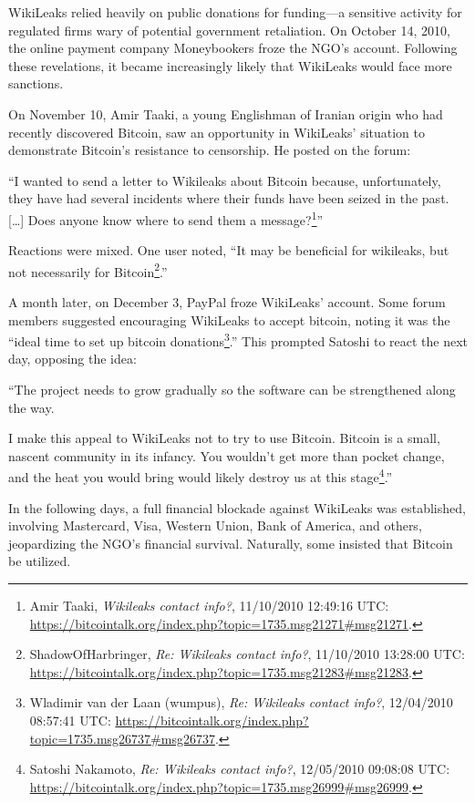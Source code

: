 \documentclass[
  a5paper,
  smalldemyvopaper,10pt,twoside,onecolumn,openright,extrafontsizes,hidelinks]{memoir}
\begin{document}
WikiLeaks relied heavily on public donations for funding---a sensitive
activity for regulated firms wary of potential government retaliation.
On October 14, 2010, the online payment company Moneybookers froze the
NGO's account. Following these revelations, it became increasingly
likely that WikiLeaks would face more sanctions.

On November 10, Amir Taaki, a young Englishman of Iranian origin who had
recently discovered Bitcoin, saw an opportunity in WikiLeaks' situation
to demonstrate Bitcoin's resistance to censorship. He posted on the
forum:

``I wanted to send a letter to Wikileaks about Bitcoin because,
unfortunately, they have had several incidents where their funds have
been seized in the past. {[}\ldots{]} Does anyone know where to send
them a message?\footnote{Amir Taaki, \emph{Wikileaks contact info?},
  11/10/2010 12:49:16 UTC:
  \url{https://bitcointalk.org/index.php?topic=1735.msg21271\#msg21271}.}''

Reactions were mixed. One user noted, ``It may be beneficial for
wikileaks, but not necessarily for Bitcoin\footnote{ShadowOfHarbringer,
  \emph{Re: Wikileaks contact info?}, 11/10/2010 13:28:00 UTC:
  \url{https://bitcointalk.org/index.php?topic=1735.msg21283\#msg21283}.}.''

A month later, on December 3, PayPal froze WikiLeaks' account. Some
forum members suggested encouraging WikiLeaks to accept bitcoin, noting
it was the ``ideal time to set up bitcoin donations\footnote{Wladimir
  van der Laan (wumpus), \emph{Re: Wikileaks contact info?}, 12/04/2010
  08:57:41 UTC:
  \url{https://bitcointalk.org/index.php?topic=1735.msg26737\#msg26737}.}.''
This prompted Satoshi to react the next day, opposing the idea:

``The project needs to grow gradually so the software can be
strengthened along the way.

I make this appeal to WikiLeaks not to try to use Bitcoin. Bitcoin is a
small, nascent community in its infancy. You wouldn't get more than
pocket change, and the heat you would bring would likely destroy us at
this stage\footnote{Satoshi Nakamoto, \emph{Re: Wikileaks contact
  info?}, 12/05/2010 09:08:08 UTC:
  \url{https://bitcointalk.org/index.php?topic=1735.msg26999\#msg26999}.}.''

In the following days, a full financial blockade against WikiLeaks was
established, involving Mastercard, Visa, Western Union, Bank of America,
and others, jeopardizing the NGO's financial survival. Naturally, some
insisted that Bitcoin be utilized.
\end{document}
